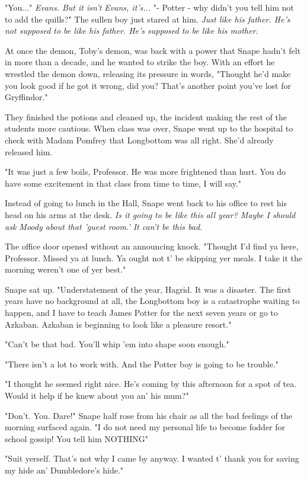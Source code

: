 \documentclass[a4paper,11pt]{article}
\begin{document}
"You..." \emph{Evans. But it isn't Evans, it's...} "- Potter - why didn't you tell him not to add the quills?" The sullen boy just stared at him. \emph{Just like his father. He's not supposed to be like his father. He's supposed to be like his mother.}

At once the demon, Toby's demon, was back with a power that Snape hadn't felt in more than a decade, and he wanted to strike the boy. With an effort he wrestled the demon down, releasing its pressure in words, "Thought he'd make you look good if he got it wrong, did you? That's another point you've lost for Gryffindor."

They finished the potions and cleaned up, the incident making the rest of the students more cautious. When class was over, Snape went up to the hospital to check with Madam Pomfrey that Longbottom was all right. She'd already released him.

"It was just a few boils, Professor. He was more frightened than hurt. You do have some excitement in that class from time to time, I will say."

Instead of going to lunch in the Hall, Snape went back to his office to rest his head on his arms at the desk. \emph{Is it going to be like this all year? Maybe I should ask Moody about that 'guest room.' It can't be this bad.}

The office door opened without an announcing knock. "Thought I'd find ya here, Professor. Missed ya at lunch. Ya ought not t' be skipping yer meals. I take it the morning weren't one of yer best."

Snape sat up. "Understatement of the year, Hagrid. It was a disaster. The first years have no background at all, the Longbottom boy is a catastrophe waiting to happen, and I have to teach James Potter for the next seven years or go to Azkaban. Azkaban is beginning to look like a pleasure resort."

"Can't be that bad. You'll whip 'em into shape soon enough."

"There isn't a lot to work with. And the Potter boy is going to be trouble."

"I thought he seemed right nice. He's coming by this afternoon for a spot of tea. Would it help if he knew about you an' his mum?"

"Don't. You. Dare!" Snape half rose from his chair as all the bad feelings of the morning surfaced again. "I do not need my personal life to become fodder for school gossip! You tell him NOTHING"

"Suit yerself. That's not why I came by anyway. I wanted t' thank you for saving my hide an' Dumbledore's hide."
\end{document}
